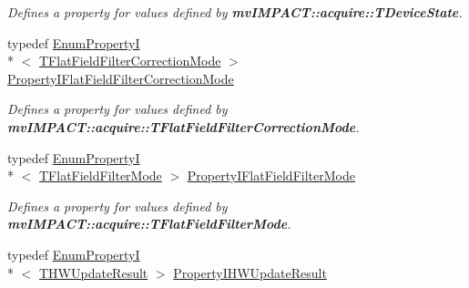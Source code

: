 \begin{DoxyCompactItemize}
\begin{DoxyCompactList}\small\item\em Defines a property for values defined by {\bfseries mv\+I\+M\+P\+A\+C\+T\+::acquire\+::\+T\+Device\+State}. \end{DoxyCompactList}\item 
\hypertarget{group___common_interface_gae5e0a9f8a06ccd71118818818a717a8c}{typedef \hyperlink{classmv_i_m_p_a_c_t_1_1acquire_1_1_enum_property_i}{Enum\+Property\+I}\\*
$<$ \hyperlink{group___common_interface_gadb6a737744f9f4b2d31a5921ca70f474}{T\+Flat\+Field\+Filter\+Correction\+Mode} $>$ \hyperlink{group___common_interface_gae5e0a9f8a06ccd71118818818a717a8c}{Property\+I\+Flat\+Field\+Filter\+Correction\+Mode}}\label{group___common_interface_gae5e0a9f8a06ccd71118818818a717a8c}

\begin{DoxyCompactList}\small\item\em Defines a property for values defined by {\bfseries mv\+I\+M\+P\+A\+C\+T\+::acquire\+::\+T\+Flat\+Field\+Filter\+Correction\+Mode}. \end{DoxyCompactList}\item 
\hypertarget{group___common_interface_ga135f01ac2dcf8ddcf43ae998eccb394e}{typedef \hyperlink{classmv_i_m_p_a_c_t_1_1acquire_1_1_enum_property_i}{Enum\+Property\+I}\\*
$<$ \hyperlink{group___common_interface_ga40b7d79a1a58736a449305e4447060f8}{T\+Flat\+Field\+Filter\+Mode} $>$ \hyperlink{group___common_interface_ga135f01ac2dcf8ddcf43ae998eccb394e}{Property\+I\+Flat\+Field\+Filter\+Mode}}\label{group___common_interface_ga135f01ac2dcf8ddcf43ae998eccb394e}

\begin{DoxyCompactList}\small\item\em Defines a property for values defined by {\bfseries mv\+I\+M\+P\+A\+C\+T\+::acquire\+::\+T\+Flat\+Field\+Filter\+Mode}. \end{DoxyCompactList}\item 
\hypertarget{group___common_interface_ga111916e947fe10d171bc6c2a10f15ae2}{typedef \hyperlink{classmv_i_m_p_a_c_t_1_1acquire_1_1_enum_property_i}{Enum\+Property\+I}\\*
$<$ \hyperlink{group___common_interface_ga11e4aee028c717dbe4bd4a9e7d97832e}{T\+H\+W\+Update\+Result} $>$ \hyperlink{group___common_interface_ga111916e947fe10d171bc6c2a10f15ae2}{Property\+I\+H\+W\+Update\+Result}}\label{group___common_interface_ga111916e947fe10d171bc6c2a10f15ae2}


\end{DoxyCompactItemize}

